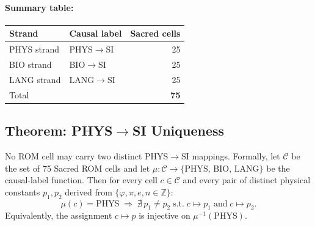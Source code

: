 \paragraph{Summary table:}
\begin{center}
\begin{tabular}{llr}
\toprule
Strand & Causal label & Sacred cells \\
\midrule
PHYS strand & PHYS$\to$SI & 25 \\
BIO  strand & BIO$\to$SI  & 25 \\
LANG strand & LANG$\to$SI & 25 \\
\midrule
Total       &             & \textbf{75} \\
\bottomrule
\end{tabular}
\end{center}


\subsection{Theorem: PHYS$\to$SI Uniqueness}
\label{ssec:flos73-uniqueness-thm}

\begin{theorem}\label{thm:flos73-phys-unique}
  No ROM cell may carry two distinct PHYS$\to$SI mappings.  Formally, let
  $\mathcal{C}$ be the set of 75 Sacred ROM cells and let
  $\mu : \mathcal{C} \to \{\mathrm{PHYS},\,\mathrm{BIO},\,\mathrm{LANG}\}$
  be the causal-label function.  Then for every cell $c \in \mathcal{C}$ and
  every pair of distinct physical constants $p_1, p_2$ derived from
  $\{\varphi, \pi, e, n \in \mathbb{Z}\}$:
  \[
    \mu(c) = \mathrm{PHYS} \;\Longrightarrow\; \nexists\, p_1 \neq p_2
      \;\text{s.t.}\; c \mapsto p_1 \;\text{and}\; c \mapsto p_2.
  \]
  Equivalently, the assignment $c \mapsto p$ is injective on
  $\mu^{-1}(\mathrm{PHYS})$.
\end{theorem}

